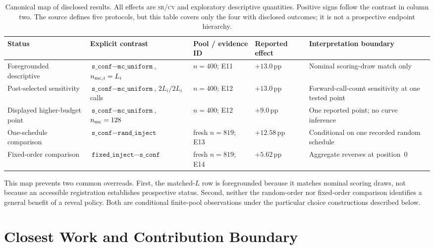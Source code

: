 \documentclass{article}
\newcommand{\sconf}{\texttt{s\_conf}}
\newcommand{\rinj}{\texttt{rand\_inject}}
\newcommand{\finj}{\texttt{fixed\_inject}}
\newcommand{\mcu}{\texttt{mc\_uniform}}
\newcommand{\pp}{\,\mathrm{pp}}
\newcommand{\srcv}{\textsc{sr/cv}}
\begin{document}
\begin{table}[H]
\centering
\footnotesize
\setlength{\tabcolsep}{3.1pt}
\caption{Canonical map of disclosed results.  All effects are \srcv{} and
exploratory descriptive quantities.  Positive signs follow the contrast in
column two.  The source defines five protocols, but this table covers only the
four with disclosed outcomes; it is not a prospective endpoint hierarchy.}
\label{tab:endpoint-hierarchy}
\begin{tabularx}{\textwidth}{@{}P{0.16\textwidth}P{0.20\textwidth}P{0.15\textwidth}P{0.16\textwidth}Y@{}}
\toprule
Status & Explicit contrast & Pool / evidence ID & Reported effect & Interpretation boundary \\
\midrule
Foregrounded descriptive & $\sconf{}-\mcu{}$, $n_{{\rm mc},i}=L_i$ & $n=400$; E11 & $+13.0\pp$ & Nominal scoring-draw match only \\
Post-selected sensitivity & $\sconf{}-\mcu{}$, $2L_i/2L_i$ calls & $n=400$; E12 & $+13.0\pp$ & Forward-call-count sensitivity at one tested point \\
Displayed higher-budget point & $\sconf{}-\mcu{}$, $n_{\rm mc}=128$ & $n=400$; E12 & $+9.0\pp$ & One reported point; no curve inference \\
One-schedule comparison & $\sconf{}-\rinj{}$ & fresh $n=819$; E13 & $+12.58\pp$ & Conditional on one recorded random schedule \\
Fixed-order comparison & $\finj{}-\sconf{}$ & fresh $n=819$; E14 & $+5.62\pp$ & Aggregate reverses at position~0 \\
\bottomrule
\end{tabularx}
\end{table}

This map prevents two common overreads.  First, the matched-$L$ row is
foregrounded because it matches nominal scoring draws, not because an
accessible registration establishes prospective status.  Second, neither the
random-order nor fixed-order comparison identifies a general benefit of a
reveal policy.  Both are conditional finite-pool observations under the
particular choice constructions described below.

\section{Closest Work and Contribution Boundary}
\label{sec:related}
\end{document}
